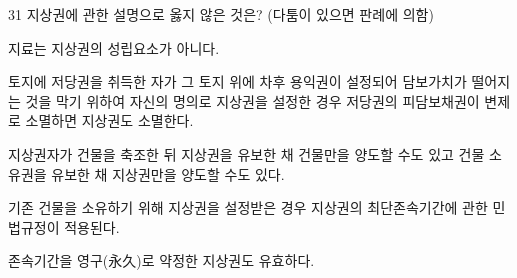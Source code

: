 \begin{question}{31}
지상권에 관한 설명으로 옳지 않은 것은? (다툼이 있으면 판례에 의함)
\begin{choices}
  \item 지료는 지상권의 성립요소가 아니다.
  \item 토지에 저당권을 취득한 자가 그 토지 위에 차후 용익권이 설정되어 담보가치가 떨어지는 것을 막기 위하여 자신의 명의로 지상권을 설정한 경우 저당권의 피담보채권이 변제로 소멸하면 지상권도 소멸한다.
  \item 지상권자가 건물을 축조한 뒤 지상권을 유보한 채 건물만을 양도할 수도 있고 건물 소유권을 유보한 채 지상권만을 양도할 수도 있다.
  \item 기존 건물을 소유하기 위해 지상권을 설정받은 경우 지상권의 최단존속기간에 관한 민법규정이 적용된다.
  \item 존속기간을 영구(永久)로 약정한 지상권도 유효하다.
\end{choices}
\end{question}
